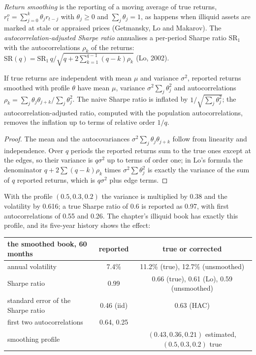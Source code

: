 \begin{definition}\label{def:rs:performance-measurement:smoothing}
\emph{Return smoothing} is the reporting of a moving average of true returns, $r^o_t = \sum_{j=0}^{k}\theta_j r_{t-j}$ with
$\theta_j \ge 0$ and $\sum_j\theta_j = 1$, as happens when illiquid assets are marked at stale or appraised prices (Getmansky, Lo and Makarov). The
\emph{autocorrelation-adjusted Sharpe ratio} annualises a per-period Sharpe ratio $\mathrm{SR}_1$ with the
autocorrelations $\rho_k$ of the returns: $\mathrm{SR}(q) = \mathrm{SR}_1\, q\big/\sqrt{q + 2\sum_{k=1}^{q-1}(q-k)\rho_k}$ (Lo, 2002).
\end{definition}

\begin{proposition}\label{prop:rs:performance-measurement:smoothing}
If true returns are independent with mean $\mu$ and variance $\sigma^2$, reported returns smoothed with profile $\theta$ have mean $\mu$, variance
$\sigma^2\sum_j\theta_j^2$ and autocorrelations $\rho_k = \sum_j\theta_j\theta_{j+k}\big/\sum_j\theta_j^2$. The naive Sharpe ratio is inflated by
$1/\sqrt{\sum_j\theta_j^2}$; the autocorrelation-adjusted ratio, computed with the population autocorrelations, removes the inflation up to terms of relative
order $1/q$.
\end{proposition}

\begin{proof}
The mean and the autocovariances $\sigma^2\sum_j\theta_j\theta_{j+k}$ follow from linearity and independence. Over $q$ periods the reported returns sum to the
true ones except at the edges, so their variance is $q\sigma^2$ up to terms of order one; in Lo's formula the denominator $q + 2\sum(q-k)\rho_k$ times
$\sigma^2\sum\theta_j^2$ is exactly the variance of the sum of $q$ reported returns, which is $q\sigma^2$ plus edge terms.
\end{proof}

With the profile $(0.5, 0.3, 0.2)$ the variance is multiplied by 0.38 and the volatility by 0.616; a true Sharpe ratio of 0.6 is reported as 0.97, with
first autocorrelations of 0.55 and 0.26. The chapter's illiquid book has exactly this profile, and its five-year history shows the effect:

\begin{center}
\small
\begin{tabular}{@{}lcc@{}}
\toprule
the smoothed book, 60 months & reported & true or corrected\\
\midrule
annual volatility & 7.4\% & 11.2\% (true), 12.7\% (unsmoothed)\\
Sharpe ratio & 0.99 & 0.66 (true), 0.61 (Lo), 0.59 (unsmoothed)\\
standard error of the Sharpe ratio & 0.46 (iid) & 0.63 (HAC)\\
first two autocorrelations & 0.64, 0.25 & \\
smoothing profile & & $(0.43, 0.36, 0.21)$ estimated, $(0.5, 0.3, 0.2)$ true\\
\bottomrule
\end{tabular}
\end{center}

